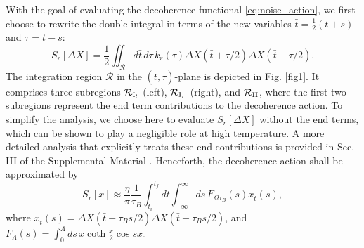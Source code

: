 \documentclass[prl,twocolumn,superscriptaddress,amsmath,amssymb]{revtex4-2}
\def\be{\begin{equation}}
\def\ee{\end{equation}}
\newcommand{\tb}{\bar{t}}
\begin{document}
With the goal of evaluating the decoherence functional \eqref{eq:noise_action}, we first choose to rewrite the double integral in terms of the new variables $\tb=\frac{1}{2}(t+s)$ and $\tau=t-s$: 
\be\label{eq:decoh_action}
    S_r[\Delta X] = \frac{1}{2}\iint_{\mathcal{R}}d\tb\,d\tau\,k_r(\tau)\Delta X(\tb+\tau/2)\Delta X(\tb-\tau/2).
\ee
The integration region $\mathcal{R}$ in the $(\tb,\tau)$-plane is depicted in Fig. \ref{fig1}. It comprises three subregions $\mathcal{R}_{{\rm I}_l}$ (left), $\mathcal{R}_{{\rm I}_r}$ (right), and $\mathcal{R}_{\rm II}$, where the first two subregions represent the end term contributions to the decoherence action. To simplify the analysis, we choose here to evaluate $S_r[\Delta X]$ without the end terms, which can be shown to play a negligible role at high temperature. A more detailed analysis that explicitly treats these end contributions is provided in Sec. III of the Supplemental Material \cite{SuppMat}. Henceforth, the decoherence action shall be approximated by
\begin{equation}\label{eq:decoh_func}
    S_r[x] \approx \frac{\eta}{\pi}\frac{1}{\tau_B}\int^{t_f}_{t_i}d\tb\int^{\infty}_{-\infty}ds\,F_{\Omega\tau_B}(s)x_{\tb}(s), 
\end{equation}
where $x_{\tb}(s)=\Delta X(\tb+\tau_Bs/2)\Delta X(\tb-\tau_Bs/2)$, and $F_{\Lambda}(s) = \int^{\Lambda}_0ds\,x\coth\frac{x}{2}\cos{sx}$. 
\end{document}
